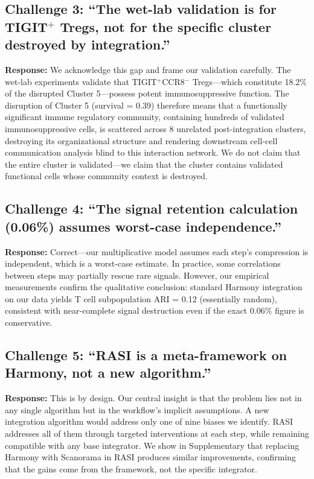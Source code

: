 \subsection*{Challenge 3: ``The wet-lab validation is for TIGIT$^+$ Tregs, not for the specific cluster destroyed by integration.''}

\textbf{Response:} We acknowledge this gap and frame our validation carefully. The wet-lab experiments validate that TIGIT$^+$CCR8$^-$ Tregs---which constitute 18.2\% of the disrupted Cluster 5---possess potent immunosuppressive function. The disruption of Cluster 5 (survival = 0.39) therefore means that a functionally significant immune regulatory community, containing hundreds of validated immunosuppressive cells, is scattered across 8 unrelated post-integration clusters, destroying its organizational structure and rendering downstream cell-cell communication analysis blind to this interaction network. We do not claim that the entire cluster is validated---we claim that the cluster contains validated functional cells whose community context is destroyed.

\subsection*{Challenge 4: ``The signal retention calculation (0.06\%) assumes worst-case independence.''}

\textbf{Response:} Correct---our multiplicative model assumes each step's compression is independent, which is a worst-case estimate. In practice, some correlations between steps may partially rescue rare signals. However, our empirical measurements confirm the qualitative conclusion: standard Harmony integration on our data yields T cell subpopulation ARI = 0.12 (essentially random), consistent with near-complete signal destruction even if the exact 0.06\% figure is conservative.

\subsection*{Challenge 5: ``RASI is a meta-framework on Harmony, not a new algorithm.''}

\textbf{Response:} This is by design. Our central insight is that the problem lies not in any single algorithm but in the workflow's implicit assumptions. A new integration algorithm would address only one of nine biases we identify. RASI addresses all of them through targeted interventions at each step, while remaining compatible with any base integrator. We show in Supplementary that replacing Harmony with Scanorama in RASI produces similar improvements, confirming that the gains come from the framework, not the specific integrator.

